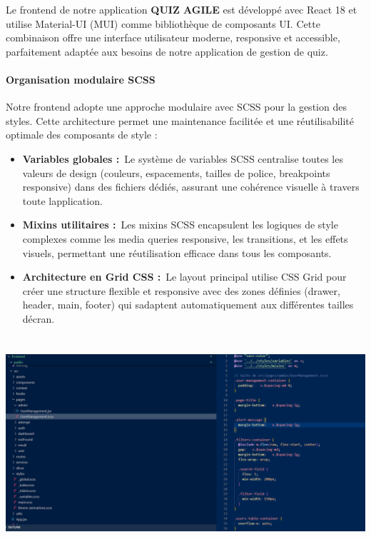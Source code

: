 \documentclass[12pt,a4paper,twoside]{report}
\begin{document}
Le frontend de notre application \textbf{QUIZ AGILE} est développé avec
React 18 et utilise Material-UI (MUI) comme bibliothèque de composants
UI. Cette combinaison offre une interface utilisateur moderne,
responsive et accessible, parfaitement adaptée aux besoins de notre
application de gestion de quiz.

\hypertarget{organisation-modulaire-scss}{%
\paragraph{\texorpdfstring{ Organisation modulaire
SCSS}{ Organisation modulaire SCSS}}\label{organisation-modulaire-scss}}

Notre frontend adopte une approche modulaire avec SCSS pour la gestion
des styles. Cette architecture permet une maintenance facilitée et une
réutilisabilité optimale des composants de style :

\begin{itemize}
\item
  \textbf{Variables globales :}~Le système de variables SCSS centralise
  toutes les valeurs de design (couleurs, espacements, tailles de
  police, breakpoints responsive) dans des fichiers dédiés, assurant une
  cohérence visuelle à travers toute l\textquotesingle application.
\item
  \textbf{Mixins utilitaires :}~Les mixins SCSS encapsulent les logiques
  de style complexes comme les media queries responsive, les
  transitions, et les effets visuels, permettant une réutilisation
  efficace dans tous les composants.
\item
  \textbf{Architecture en Grid CSS :}~Le layout principal utilise CSS
  Grid pour créer une structure flexible et responsive avec des zones
  définies (drawer, header, main, footer) qui s\textquotesingle adaptent
  automatiquement aux différentes tailles d\textquotesingle écran.
\end{itemize}

\includegraphics[width=6.29921in,height=3.1063in]{latex_media/media/image50.png}
\end{document}
